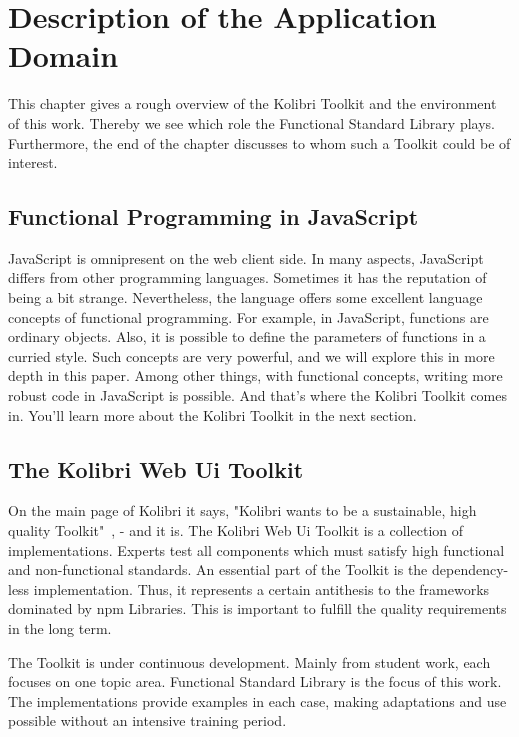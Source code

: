 \section{Description of the Application Domain}
\label{Description of the Application Domain}
This chapter gives a rough overview of the Kolibri Toolkit and the environment
of this work. Thereby we see which role the Functional Standard Library plays.
Furthermore, the end of the chapter discusses to whom such a Toolkit could be of interest.

\subsection{Functional Programming in JavaScript}
\label{sub:Functional Programming in JavaScript}
JavaScript is omnipresent on the web client side. 
In many aspects, JavaScript differs from other programming
languages. Sometimes it has the reputation of being a bit strange.
Nevertheless, the language offers some excellent language concepts of
functional programming. For example, in JavaScript, functions are ordinary
objects. Also, it is possible to define the parameters of functions in a
curried style. Such concepts are very powerful, and we will explore this in
more depth in this paper. Among other things, with functional concepts, writing
more robust code in JavaScript is possible. And that's where the Kolibri
Toolkit comes in. You'll learn more about the Kolibri Toolkit in the next
section.

\subsection{The Kolibri Web Ui Toolkit}
\label{The Kolibri Web Ui Toolkit}
On the main page of Kolibri it says, "Kolibri wants to be a sustainable, high
quality Toolkit"~\cite{kolibri}, - and it is.
The Kolibri Web Ui Toolkit is a collection of implementations. Experts test all
components which must satisfy high functional and non-functional standards. An
essential part of the Toolkit is the dependency-less implementation. Thus, it
represents a certain antithesis to the frameworks dominated by npm Libraries.
This is important to fulfill the quality requirements in the long term.

The Toolkit is under continuous development. Mainly from student work, each
focuses on one topic area. Functional Standard Library is the focus of this
work. The implementations provide examples in each case, making adaptations and
use possible without an intensive training period.

